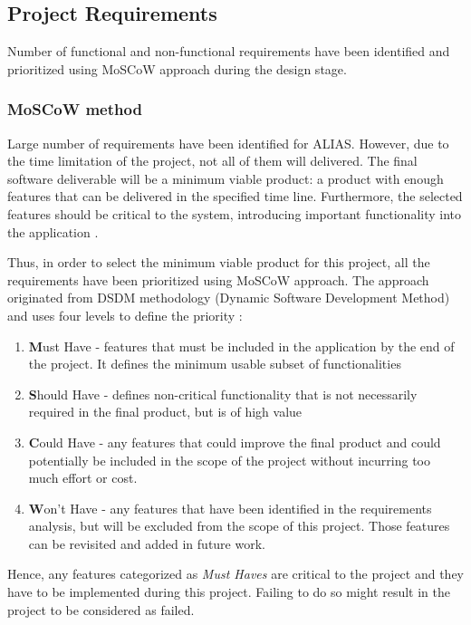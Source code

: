 \subsection{Project Requirements} \label{label:projectRequirements}
Number of functional and non-functional requirements have been identified and prioritized using MoSCoW approach during the design stage. 

\subsubsection{MoSCoW method}
Large number of requirements have been identified for ALIAS. However, due to the time limitation of the project, not all of them will delivered. The final software deliverable will be a minimum viable product: a product with enough features that can be delivered in the specified time line. Furthermore, the selected features should be critical to the system, introducing important functionality into the application \citep{mvp}.

Thus, in order to select the minimum viable product for this project, all the requirements have been prioritized using MoSCoW approach. The approach originated from DSDM methodology (Dynamic Software Development Method) and uses four levels to define the priority \citep{moscow}:

\begin{enumerate}
	\item \textbf{M}ust Have - features that must be included in the application by the end of the project. It defines the minimum usable subset of functionalities 
	\item \textbf{S}hould Have - defines non-critical functionality that is not necessarily required in the final product, but is of high value
	\item \textbf{C}ould Have - any features that could improve the final product and could potentially be included in the scope of the project without incurring too much effort or cost.
	\item \textbf{W}on't Have - any features that have been identified in the requirements analysis, but will be excluded from the scope of this project. Those features can be revisited and added in future work.
\end{enumerate}

Hence, any features categorized as \textit{Must Haves} are critical to the project and they have to be implemented during this project. Failing to do so might result in the project to be considered as failed. 

